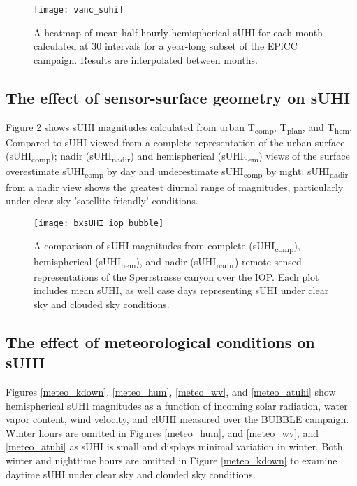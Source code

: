 \begin{bibunit}
\begin{figure}[H]
	\centering
	\texttt{[image: vanc\_suhi]}
	\caption{A heatmap of mean half hourly hemispherical sUHI for each month calculated at 30 \si{\min} intervals for a year-long subset of the EPiCC campaign. Results are interpolated between months.}
	\label{vanc_suhi}
\end{figure}

\subsection{The effect of sensor-surface geometry on sUHI}

Figure \ref{bx_suhi_compare} shows sUHI magnitudes calculated from urban T\textsubscript{comp}, T\textsubscript{plan}, and T\textsubscript{hem}. Compared to sUHI viewed from a complete representation of the urban surface (sUHI\textsubscript{comp}); nadir (sUHI\textsubscript{nadir}) and hemispherical (sUHI\textsubscript{hem}) views of the surface overestimate sUHI\textsubscript{comp} by day and underestimate sUHI\textsubscript{comp} by night. sUHI\textsubscript{nadir} from a nadir view shows the greatest diurnal range of magnitudes, particularly under clear sky 'satellite friendly' conditions. 

\begin{figure}[H]
	\centering
	\texttt{[image: bxsUHI\_iop\_bubble]}
	\caption{A comparison of sUHI magnitudes from complete (sUHI\textsubscript{comp}), hemispherical (sUHI\textsubscript{hem}), and nadir (sUHI\textsubscript{nadir}) remote sensed representations of the Sperrstrasse canyon over the IOP. Each plot includes mean sUHI, as well case days representing sUHI under clear sky and clouded sky conditions.}
	\label{bx_suhi_compare}
\end{figure}

\subsection{The effect of meteorological conditions on sUHI}

Figures \ref{meteo_kdown}, \ref{meteo_hum}, \ref{meteo_wv}, and \ref{meteo_atuhi} show hemispherical sUHI magnitudes as a function of incoming solar radiation, water vapor content, wind velocity, and clUHI measured over the BUBBLE campaign. Winter hours are omitted in Figures \ref{meteo_hum}, and \ref{meteo_wv}, and \ref{meteo_atuhi} as sUHI is small and displays minimal variation in winter. Both winter and nighttime hours are omitted in Figure \ref{meteo_kdown} to examine daytime sUHI under clear sky and clouded sky conditions.


\end{bibunit}
